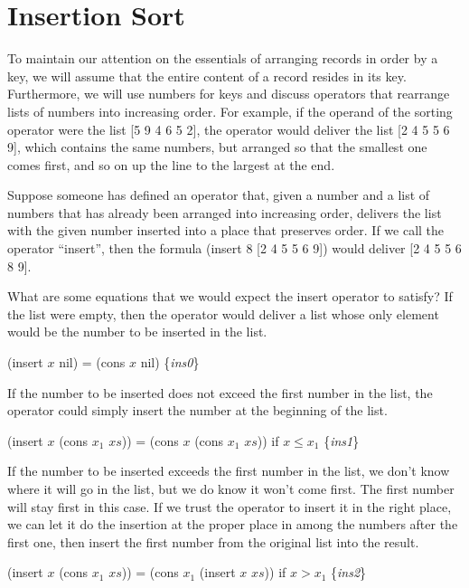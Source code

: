 \section{Insertion Sort}
\label{sec:insertion-sort}

To maintain our attention on the essentials of
arranging records in order by a key, we will
assume that the entire content of a record
resides in its key.
Furthermore, we will use numbers for keys
and discuss operators that rearrange lists
of numbers into increasing order.
For example, if the operand of the sorting
operator were the list [5 9 4 6 5 2],
the operator would deliver the list [2 4 5 5 6 9],
which contains the same numbers, but arranged so
that the smallest one comes first, and so on up the
line to the largest at the end.

Suppose someone has defined an operator that,
given a number and a list of numbers that has
already been arranged into increasing order,
delivers the list with the given number inserted
into a place that preserves order.
If we call the operator ``insert'', then
the formula (insert 8 [2 4 5 5 6 9]) would
deliver [2 4 5 5 6 8 9].

What are some equations that we would expect
the insert operator to satisfy?
If the list were empty, then the operator
would deliver a list whose only element would
be the number to be inserted in the list.

\hspace{1cm} (insert $x$ nil) = (cons $x$ nil) \hfill \{\emph{ins0}\}

If the number to be inserted does not exceed the
first number in the list, the operator could simply
insert the number at the beginning of the list.

\hspace{1cm} (insert $x$ (cons $x_1$ $xs$)) = (cons $x$ (cons $x_1$ $xs$)) if $x \le x_1$
\hfill \{\emph{ins1}\}

If the number to be inserted exceeds the first number
in the list, we don't know where it will go in the list,
but we do know it won't come first.
The first number will stay first in this case.
If we trust the operator to insert it in the right place,
we can let it do the insertion at the proper place
in among the numbers after the first one,
then insert the first number from the original list
into the result.

\hspace{1cm} (insert $x$ (cons $x_1$ $xs$)) = (cons $x_1$ (insert $x$ $xs$)) if $x > x_1$
\hfill \{\emph{ins2}\}


